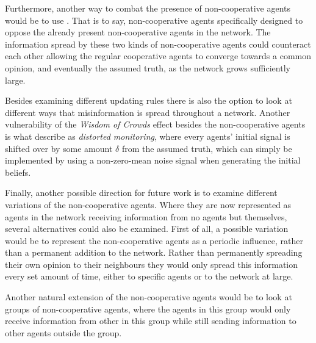 \documentclass{article}
\begin{document}
\noindent Furthermore, another way to combat the presence of non-cooperative agents would be to use . That is to say, non-cooperative agents specifically designed to oppose the already present non-cooperative agents in the network. The information spread by these two kinds of non-cooperative agents could counteract each other allowing the regular cooperative agents to converge towards a common opinion, and eventually the assumed truth, as the network grows sufficiently large.

\noindent Besides examining different updating rules there is also the option to look at different ways that misinformation is spread throughout a network. Another vulnerability of the \emph{Wisdom of Crowds} effect besides the non-cooperative agents is what \cite{amir2021robust} describe as \emph{distorted monitoring}, where every agents' initial signal is shifted over by some amount $\delta$ from the assumed truth, which can simply be implemented by using a non-zero-mean noise signal when generating the initial beliefs.

\noindent Finally, another possible direction for future work is to examine different variations of the non-cooperative agents. Where they are now represented as agents in the network receiving information from no agents but themselves, several alternatives could also be examined. First of all, a possible variation would be to represent the non-cooperative agents as a periodic influence, rather than a permanent addition to the network. Rather than permanently spreading their own opinion to their neighbours they would only spread this information every set amount of time, either to specific agents or to the network at large. 

\noindent Another natural extension of the non-cooperative agents would be to look at groups of non-cooperative agents, where the agents in this group would only receive information from other in this group while still sending information to other agents outside the group.



\end{document}
